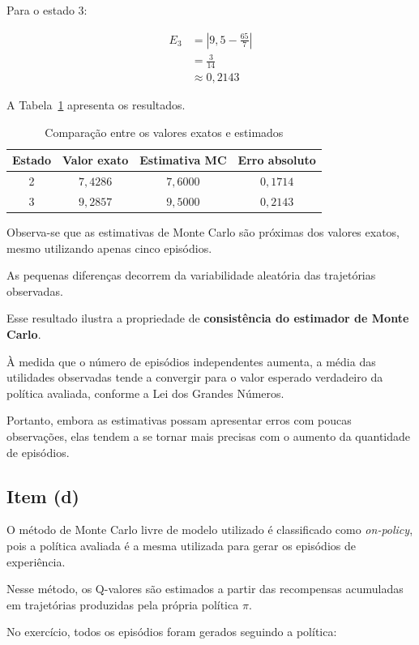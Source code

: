Para o estado $3$:

\[
\begin{aligned}
E_3
&=\left|9{,}5-\frac{65}{7}\right|\\
&=\frac{3}{14}\\
&\approx0{,}2143
\end{aligned}
\]

A Tabela~\ref{tab:comparacao_mc}
apresenta os resultados.

\begin{table}[H]
\centering
\caption{Comparação entre os valores exatos e estimados}
\label{tab:comparacao_mc}
\begin{tabular}{cccc}
\toprule
Estado & Valor exato & Estimativa MC & Erro absoluto\\
\midrule
2 & $7{,}4286$ & $7{,}6000$ & $0{,}1714$\\
3 & $9{,}2857$ & $9{,}5000$ & $0{,}2143$\\
\bottomrule
\end{tabular}
\end{table}

Observa-se que as estimativas de Monte Carlo
são próximas dos valores exatos, mesmo
utilizando apenas cinco episódios.

As pequenas diferenças decorrem da
variabilidade aleatória das trajetórias
observadas.

Esse resultado ilustra a propriedade de
\textbf{consistência do estimador de
Monte Carlo}.

À medida que o número de episódios
independentes aumenta, a média das
utilidades observadas tende a convergir
para o valor esperado verdadeiro
da política avaliada, conforme
a Lei dos Grandes Números.

Portanto, embora as estimativas possam
apresentar erros com poucas observações,
elas tendem a se tornar mais precisas
com o aumento da quantidade de episódios.


\subsection{Item (d)}

O método de Monte Carlo livre de modelo
utilizado é classificado como
\textit{on-policy}, pois a política
avaliada é a mesma utilizada para
gerar os episódios de experiência.

Nesse método, os Q-valores são
estimados a partir das recompensas
acumuladas em trajetórias produzidas
pela própria política $\pi$.

No exercício, todos os episódios
foram gerados seguindo a política:

